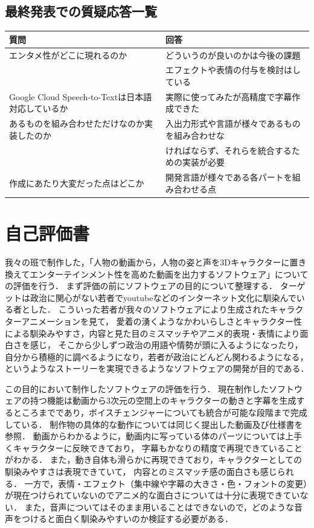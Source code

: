 \documentclass[a4paper,12pt]{jsarticle}
\begin{document}
\subsection{最終発表での質疑応答一覧}

\begin{table}[H]
	\begin{tabular}{|l|l|} \hline
		{\bf 質問} & {\bf 回答} \\ \hline \hline
		エンタメ性がどこに現れるのか & どういうのが良いのかは今後の課題\\&エフェクトや表情の付与を検討はしている \\ \hline
		Google Cloud Speech-to-Textは日本語対応しているか & 実際に使ってみたが高精度で字幕作成できた\\ \hline
		あるものを組み合わせただけなのか実装したのか & 入出力形式や言語が様々であるものを組み合わせな\\&ければならず、それらを統合するための実装が必要\\ \hline
		作成にあたり大変だった点はどこか & 開発言語が様々である各パートを組み合わせる点\\ \hline
	\end{tabular}
\end{table}

\section{自己評価書}
我々の班で制作した，「人物の動画から，人物の姿と声を3Dキャラクターに置き換えてエンターテインメント性を高めた動画を出力するソフトウェア」についての評価を行う．
まず評価の前にソフトウェアの目的について整理する．
ターゲットは政治に関心がない若者でyoutubeなどのインターネット文化に馴染んでいる者とした．
こういった若者が我々のソフトウェアにより生成されたキャラクターアニメーションを見て，
愛着の湧くようなかわいらしさとキャラクター性による馴染みやすさ，内容と見た目のミスマッチやアニメ的表現・表情により面白さを感じ，
そこから少しずつ政治の用語や情勢が頭に入るようになったり，
自分から積極的に調べるようになり，若者が政治にどんどん関わるようになる，
というようなストーリーを実現できるようなソフトウェアの開発が目的である．

この目的において制作したソフトウェアの評価を行う．
現在制作したソフトウェアの持つ機能は動画から3次元の空間上のキャラクターの動きと字幕を生成するところまでであり，ボイスチェンジャーについても統合が可能な段階まで完成している．
制作物の具体的な動作については同じく提出した動画及び仕様書を参照．
動画からわかるように，動画内に写っている体のパーツについては上手くキャラクターに反映できており，
字幕もかなりの精度で再現できていることがわかる．
また，動き自体も滑らかに再現できており，キャラクターとしての馴染みやすさは表現できていて，
内容とのミスマッチ感の面白さも感じられる．
一方で，表情・エフェクト（集中線や字幕の大きさ・色・フォントの変更）が現在つけられていないのでアニメ的な面白さについては十分に表現できていない．
また，音声についてはそのまま用いることはできないので，どのような音声をつけると面白く馴染みやすいのか検証する必要がある．
\end{document}
